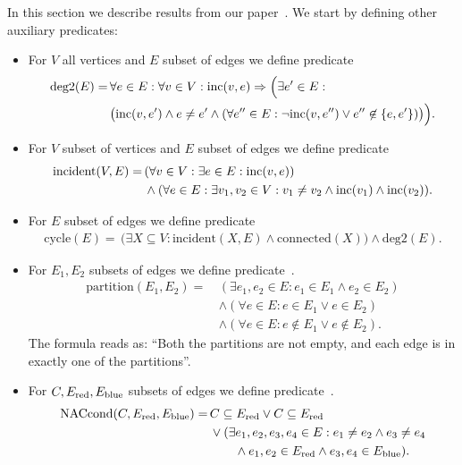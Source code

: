 In this section we describe results from our paper~\cite{my_paper}.
We start by defining other auxiliary predicates:
%
\begin{itemize}
	\item For \( V \) all vertices and \( E \) subset of edges we define predicate
	      \begin{align*}
		      \text{deg2}(E) = \,
		       & \forall e \in E : \forall v \in V : \text{inc} (v, e) \Rightarrow \Big( \exists e^\prime \in E : \\
		       & \big( \text{inc} (v, e^\prime) \land e \ne e^\prime \land (\forall e^{\prime\prime} \in E :
				      \lnot \text{inc} (v, e^{\prime\prime}) \lor e^{\prime\prime} \not\in \{e, e^\prime\}) \big) \Big).
	      \end{align*}
	\item For \( V \) subset of vertices and \( E \) subset of edges we define predicate
	      \begin{align*}
		      \text{incident}(V, E) = \,
		       & (\forall v \in V : \exists e \in E : \text{inc} (v, e))                                                 \\
		       & \land (\forall e \in E : \exists v_1, v_2 \in V : v_1 \ne v_2 \land \text{inc} (v_1) \land \text{inc} (v_2)).
	      \end{align*}
	\item For \( E \) subset of edges we define predicate
	      \begin{align*}
		      \text{cycle}(E) = \,
		      \big( \exists X \subseteq V : \text{incident}(X, E) \land \text{connected}(X) \big)
		      \land \text{deg2}(E).
	      \end{align*}
	\item For \( E_1, E_2 \) subsets of edges we define predicate~\cite{my_paper}.
	      \begin{align*}
		      \text{partition}(E_1, E_2) = \, & (\exists e_1, e_2 \in E : e_1 \in E_1 \land e_2 \in E_2 )    \\
		                                      & \land (\forall e \in E : e \in E_1 \lor e \in E_2 )          \\
		                                      & \land (\forall e \in E : e \not\in E_1 \lor e \not\in E_2 ).
	      \end{align*}
	      The formula reads as: ``Both the partitions are not empty,
	      and each edge is in exactly one of the partitions''.
	\item For \( C, E_{\text{red}}, E_{\text{blue}} \) subsets of edges we define predicate~\cite{my_paper}.
	      \begin{align*}
		      \text{NACcond}(C, E_{\text{red}}, E_{\text{blue}}) = \,
		       & C \subseteq E_{\text{red}} \lor C \subseteq E_{\text{red}}
		      \\
		       & \lor (\exists e_1, e_2, e_3, e_4 \in E :
		      e_1 \ne e_2 \land e_3 \ne e_4
		      \\
		       & \qquad \land e_1, e_2 \in E_{\text{red}} \land e_3, e_4 \in E_{\text{blue}} ).
	      \end{align*}
\end{itemize}
%

